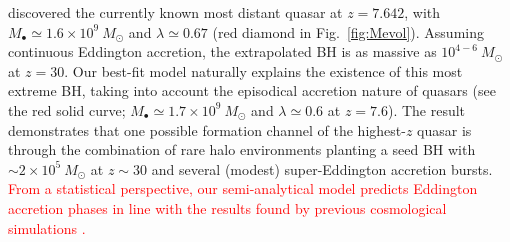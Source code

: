 \documentclass[twocolumn, twocolappendix]{aastex63}
\newcommand{\Msun}{M_\odot}
\newcommand{\red}[1]{\textcolor{red}{ #1}}
\begin{document}
\begin{CJK*}{UTF8}{gbsn}
\citet{2021ApJ...907L...1W} discovered the currently known most distant quasar at $z=7.642$,
with $M_{\bullet}\simeq 1.6\times 10^9~\Msun$ and $\lambda \simeq 0.67$ (red diamond in Fig.~\ref{fig:Mevol}).
Assuming continuous Eddington accretion, the extrapolated BH is as massive as $10^{4-6}~\Msun$ at $z= 30$. 
Our best-fit model naturally explains the existence of this most extreme BH,
taking into account the episodical accretion nature of quasars (see the red solid curve;
$M_\bullet \simeq 1.7\times 10^9~\Msun$ and $\lambda \simeq 0.6$ at $z=7.6$).
The result demonstrates that
one possible formation channel of the highest-$z$ quasar is through the combination of rare halo environments planting a seed BH 
with $\sim 2\times 10^5~\Msun$ at $z\sim 30$ and several (modest) super-Eddington accretion bursts.
\red{
From a statistical perspective, our semi-analytical model predicts Eddington accretion phases in line with the results found by previous cosmological simulations
\citep{2017MNRAS.467.4243D,2018MNRAS.473.4003B,2019MNRAS.488.4004L}.
}



\end{CJK*}
\end{document}
